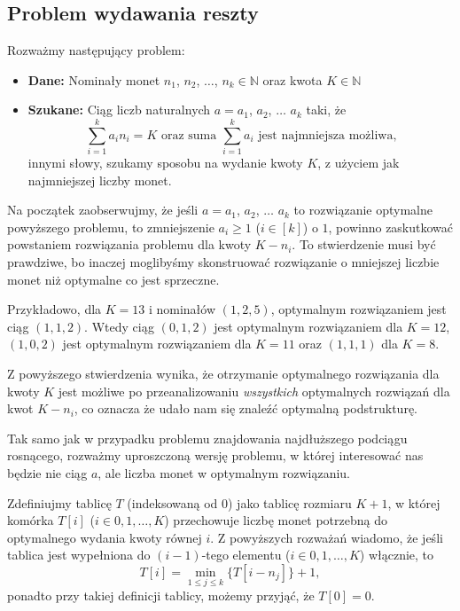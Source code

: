 \subsection{Problem wydawania reszty}
Rozważmy następujący problem:
\begin{itemize}
	\item[] \textbf{Dane:} Nominały monet $n_1$, $n_2$, 
	$\ldots$, $n_k \in \mathbb{N}$ oraz kwota $K \in \mathbb{N}$
	\item[] \textbf{Szukane:} Ciąg liczb naturalnych $a = a_1$, $a_2$,
	$\ldots$ $a_k$ taki, że 
	\[\sum\limits_{i=1}^{k} a_in_i = K \text{ oraz suma } 
	\sum\limits_{i=1}^{k} a_i
	\text{ jest najmniejsza możliwa,}\]
	innymi słowy, szukamy sposobu na wydanie kwoty $K$, z użyciem
	jak najmniejszej liczby monet.
\end{itemize}

Na początek zaobserwujmy, że jeśli $a = a_1$, $a_2$,
$\ldots$ $a_k$ to rozwiązanie optymalne powyższego problemu, to 
zmniejszenie $a_i \geq 1$ ($i \in [k]$) o $1$, powinno 
zaskutkować powstaniem rozwiązania problemu dla kwoty $K - n_i$.
To stwierdzenie musi być prawdziwe, bo inaczej moglibyśmy
skonstruować rozwiązanie o mniejszej liczbie monet
niż optymalne co jest sprzeczne.

Przykładowo, dla $K = 13$ i nominałów $(1, 2, 5)$, optymalnym
rozwiązaniem jest ciąg $(1, 1, 2)$. Wtedy ciąg $(0, 1, 2)$
jest optymalnym rozwiązaniem dla $K = 12$, 
$(1, 0, 2)$ jest optymalnym rozwiązaniem dla $K = 11$ oraz
$(1, 1, 1)$ dla $K = 8$.

Z powyższego stwierdzenia wynika, że otrzymanie optymalnego 
rozwiązania dla kwoty $K$ jest możliwe po przeanalizowaniu 
\textit{wszystkich} optymalnych rozwiązań dla kwot $K - n_i$,
co oznacza że udało nam się znaleźć optymalną podstrukturę.

Tak samo jak w przypadku problemu znajdowania najdłuższego 
podciągu rosnącego, rozważmy uproszczoną wersję problemu, 
w której interesować nas będzie nie ciąg $a$, ale 
liczba monet w optymalnym rozwiązaniu. 

Zdefiniujmy tablicę $T$ (indeksowaną od $0$) jako 
tablicę rozmiaru $K + 1$, w której komórka $T[i]$ ($i \in {0, 1, \ldots, K}$)
przechowuje liczbę monet potrzebną do optymalnego wydania kwoty równej $i$.
Z powyższych rozważań
wiadomo, że jeśli tablica jest wypełniona do $(i-1)$-tego
elementu ($i \in {0, 1, \ldots, K}$) włącznie, to 
\begin{equation}
	T[i] = \min_{1 \leq j \leq k}\{T[i - n_j]\} + 1,
	\label{eq:min_change_making_relation}
\end{equation}
ponadto przy takiej definicji tablicy, możemy przyjąć, że $T[0] = 0$.

